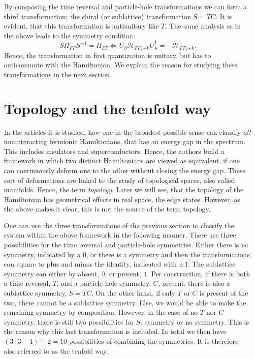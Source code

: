 By composing the time reversal and particle-hole transformations we can form a third transformation; the chiral (or sublattice) transformation $S = TC$. It is evident, that this transformation is antiunitary like $T$. The same analysis as in the above leads to the symmetry condition:
\begin{equation}
SH_{FF}S^{-1} = H_{FF} \Leftrightarrow U_S\mathcal{H}_{FF,+k} U^\dagger_S = - \mathcal{H}_{FF,+k}.
\end{equation}
Hence, the transformation in first quantization is unitary, but has to anticommute with the Hamiltonian. We explain the reason for studying these transformations in the next section.

\section{Topology and the tenfold way} \label{sec.Topology10foldway}
In the articles \cite{Ludwig.Topology, Chiu.Topology} it is studied, how one in the broadest possible sense can classify \textit{all} noninteracting fermionic Hamiltonians, that has an energy gap in the spectrum. This includes insulators and superconductors. Hence, the authors build a framework in which two distinct Hamiltonians are viewed as equivalent, if one can continuously deform one to the other without closing the energy gap. These sort of deformations are linked to the study of topological spaces, also called manifolds. Hence, the term \textit{topology}. Later we will see, that the topology of the Hamiltonian has geometrical effects in real space, the edge states. However, as the above makes it clear, this is not the source of the term topology.  

One can use the three transformations of the previous section to classify the system within the above framework in the following manner. There are three possibilities for the time reversal and particle-hole symmetries. Either there is no symmetry, indicated by a $0$, or there is a symmetry and then the transformations can square to plus and minus the identity, indicated with $\pm 1$. The sublattice symmetry can either by absent, $0$, or present, $1$. Per construction, if there is both a time reversal, $T$, and a particle-hole symmetry, $C$, present, there is also a sublattice symmetry, $S=TC$. On the other hand, if only $T$ or $C$ is present of the two, there cannot be a sublattice symmetry. Else, we would be able to make the remaining symmetry by composition. However, in the case of no $T$ nor $C$ symmetry, there is still two possibilities for $S$: symmetry or no symmetry. This is the reason why this last transformation is included. In total we then have $(3\cdot 3 - 1) + 2 = 10$ possibilities of combining the symmetries. It is therefore also referred to as the tenfold way. 

